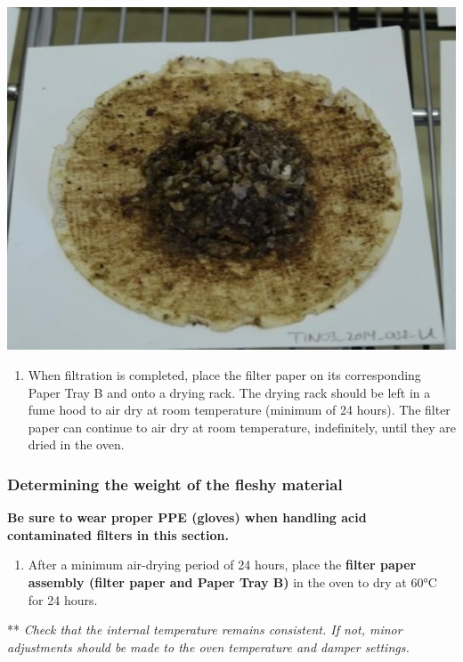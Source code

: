 \documentclass[]{book}
\providecommand{\tightlist}{%
  \setlength{\itemsep}{0pt}\setlength{\parskip}{0pt}}
\begin{document}
\includegraphics{images/CAU_filter.jpg}

\begin{enumerate}
\def\labelenumi{\arabic{enumi}.}
\setcounter{enumi}{3}
\tightlist
\item
  When filtration is completed, place the filter paper on its corresponding Paper Tray B and onto a drying rack. The drying rack should be left in a fume hood to air dry at room temperature (minimum of 24 hours). The filter paper can continue to air dry at room temperature, indefinitely, until they are dried in the oven.
\end{enumerate}

\hypertarget{determining-the-weight-of-the-fleshy-material}{%
\subsubsection{Determining the weight of the fleshy material}\label{determining-the-weight-of-the-fleshy-material}}

\textbf{Be sure to wear proper PPE (gloves) when handling acid contaminated filters in this section.}

\begin{enumerate}
\def\labelenumi{\arabic{enumi}.}
\tightlist
\item
  After a minimum air-drying period of 24 hours, place the \textbf{filter paper assembly (filter paper and Paper Tray B)} in the oven to dry at 60°C for 24 hours.
\end{enumerate}

** \emph{Check that the internal temperature remains consistent. If not, minor adjustments should be made to the oven temperature and damper settings.}
\end{document}
